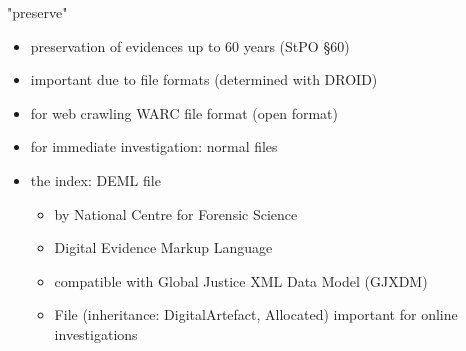 \documentclass{beamer}
\begin{document}
\begin{frame}{"preserve"}

\begin{itemize}
  \item preservation of evidences up to 60 years (StPO \S60)
  \item important due to file formats (determined with DROID)
  \item for web crawling WARC file format (open format)
  \item for immediate investigation: normal files
  \item the index: DEML file
  \begin{itemize}
    \item by National Centre for Forensic Science
    \item Digital Evidence Markup Language
    \item compatible with Global Justice XML Data Model (GJXDM)
    \item File (inheritance: DigitalArtefact, Allocated) important for online investigations
  \end{itemize}
\end{itemize}

\end{frame}
\end{document}
